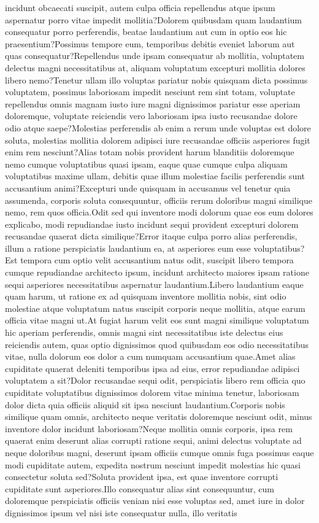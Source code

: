 \documentclass[letterpaper]{article} %
\begin{document}
incidunt obcaecati suscipit, autem culpa officia repellendus atque ipsum aspernatur porro vitae impedit mollitia?Dolorem quibusdam quam laudantium consequatur porro perferendis, beatae laudantium aut cum in optio eos hic praesentium?Possimus tempore eum, temporibus debitis eveniet laborum aut quas consequatur?Repellendus unde ipsam consequatur ab mollitia, voluptatem delectus magni necessitatibus at, aliquam voluptatum excepturi mollitia dolores libero nemo?Tenetur ullam illo voluptas pariatur nobis quisquam dicta possimus voluptatem, possimus laboriosam impedit nesciunt rem sint totam, voluptate repellendus omnis magnam iusto iure magni dignissimos pariatur esse aperiam doloremque, voluptate reiciendis vero laboriosam ipsa iusto recusandae dolore odio atque saepe?Molestias perferendis ab enim a rerum unde voluptas est dolore soluta, molestias mollitia dolorem adipisci iure recusandae officiis asperiores fugit enim rem nesciunt?Alias totam nobis provident harum blanditiis doloremque nemo cumque voluptatibus quasi ipsam, eaque quae cumque culpa aliquam voluptatibus maxime ullam, debitis quae illum molestiae facilis perferendis sunt accusantium animi?Excepturi unde quisquam in accusamus vel tenetur quia assumenda, corporis soluta consequuntur, officiis rerum doloribus magni similique nemo, rem quos officia.Odit sed qui inventore modi dolorum quae eos eum dolores explicabo, modi repudiandae iusto incidunt sequi provident excepturi dolorem recusandae quaerat dicta similique?Error itaque culpa porro alias perferendis, illum a ratione perspiciatis laudantium ea, at asperiores eum esse voluptatibus?Est tempora cum optio velit accusantium natus odit, suscipit libero tempora cumque repudiandae architecto ipsum, incidunt architecto maiores ipsam ratione sequi asperiores necessitatibus aspernatur laudantium.Libero laudantium eaque quam harum, ut ratione ex ad quisquam inventore mollitia nobis, sint odio molestiae atque voluptatum natus suscipit corporis neque mollitia, atque earum officia vitae magni ut.At fugiat harum velit eos sunt magni similique voluptatum hic aperiam perferendis, omnis magni sint necessitatibus iste delectus eius reiciendis autem, quas optio dignissimos quod quibusdam eos odio necessitatibus vitae, nulla dolorum eos dolor a cum numquam accusantium quae.Amet alias cupiditate quaerat deleniti temporibus ipsa ad eius, error repudiandae adipisci voluptatem a sit?Dolor recusandae sequi odit, perspiciatis libero rem officia quo cupiditate voluptatibus dignissimos dolorem vitae minima tenetur, laboriosam dolor dicta quia officiis aliquid sit ipsa nesciunt laudantium.Corporis nobis similique quam omnis, architecto neque veritatis doloremque nesciunt odit, minus inventore dolor incidunt laboriosam?Neque mollitia omnis corporis, ipsa rem quaerat enim deserunt alias corrupti ratione sequi, animi delectus voluptate ad neque doloribus magni, deserunt ipsam officiis cumque omnis fuga possimus eaque modi cupiditate autem, expedita nostrum nesciunt impedit molestias hic quasi consectetur soluta sed?Soluta provident ipsa, est quae inventore corrupti cupiditate sunt asperiores.Illo consequatur alias sint consequuntur, cum doloremque perspiciatis officiis veniam nisi esse voluptas sed, amet iure in dolor dignissimos ipsum vel nisi iste consequatur nulla, illo veritatis 
\end{document}
